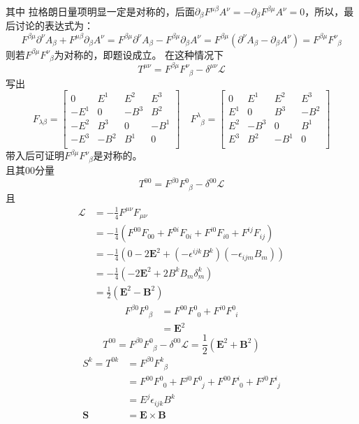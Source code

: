 \documentclass{article}
\begin{document}
其中 拉格朗日量项明显一定是对称的，后面$\partial_{\beta} F^{\mu \beta} A^{\nu} = - \partial_{\beta} F^{\beta \mu} A^{\nu} = 0$，所以，最后讨论的表达式为：
$$
F^{\beta \mu} \partial^{\nu} A_{\beta} + F^{\mu \beta} \partial_{\beta}A^{\nu} = F^{\beta \mu} \partial^{\nu} A_{\beta} - F^{\beta \mu} \partial_{\beta}A^{\nu} =  F^{\beta \mu}(\partial^{\nu} A_{\beta} -\partial_{\beta}A^{\nu} ) 
= F^{\beta \mu} F^{\nu}_{\phantom{\nu} \beta}
$$
则若$F^{\beta \mu} F^{\nu}_{\phantom{\nu} \beta}$为对称的，即题设成立。
在这种情况下$$T^{\mu \nu} = F^{\beta \mu} F^{\nu}_{\phantom{\nu} \beta} - \delta^{\mu \nu} \mathcal{L}$$
写出$$
F_{\lambda \beta} = 
\left[ 
	\begin{matrix}
	0 & E^1 & E^2 & E^3 \\
	-E^1 & 0	& -B^3 & B^2 \\
	-E^2 & B^3 & 0 & -B^1 \\
	-E^3 & -B^2 & B^1 & 0 \\	
	\end{matrix}
\right]
\quad
F^{\lambda}_{\phantom{\lambda} \beta} = 
\left[ 
	\begin{matrix}
	0 & E^1 & E^2 & E^3 \\
	E^1 & 0	& B^3 & -B^2 \\
	E^2 & -B^3 & 0 & B^1 \\
	E^3 & B^2 & -B^1 & 0 \\	
	\end{matrix}
\right]
$$
带入后可证明$F^{\beta \mu} F^{\nu}_{\phantom{\nu} \beta}$是对称的。\\
且其00分量$$T^{00} =  F^{\beta 0} F^{0}_{\phantom{0} \beta} - \delta^{0 0} \mathcal{L}$$
且
\begin{align}
\mathcal{L} &= - \frac{1}{4} F^{\mu \nu} F_{\mu \nu} \nonumber \\
			&= - \frac{1}{4} (F^{ 0 0} F_{0 0 } + F^{0 i} F_{0 i}+ F^{i 0} F_{i 0}+ F^{i j} F_{i j}) \nonumber \\
			&= - \frac{1}{4} (0- 2\mathbf{E}^2 +(- \epsilon^{ijk} B^{k} )(- \epsilon_{ijm} B_{m})) \nonumber \\
			&= - \frac{1}{4} (-2\mathbf{E}^2 + 2B^{k}B_{m} \delta^{k}_{m}) \nonumber \\
			&=  \frac{1}{2} (\mathbf{E}^2 -\mathbf{B}^2) \nonumber
\end{align}
\begin{align}
 F^{\beta 0} F^{0}_{\phantom{0} \beta}
		&= F^{0 0} F^{0}_{\phantom{0} 0} +F^{i 0} F^{0}_{\phantom{0} i} \nonumber \\
		&= \mathbf{E}^2 \nonumber
\end{align}
$$T^{00} =  F^{\beta 0} F^{0}_{\phantom{0} \beta} - \delta^{0 0} \mathcal{L}= \frac{1}{2} (\mathbf{E}^2 +\mathbf{B}^2)$$
\begin{align}
S^{k} = T^{0 k} &=  F^{\beta 0} F^{k}_{\phantom{k} \beta} \nonumber \\
	&=  F^{0 0} F^{0}_{\phantom{0} 0} +  F^{j 0} F^{0}_{\phantom{0} j} + F^{0 0} F^{i}_{\phantom{i} 0} +  F^{j 0} F^{i}_{\phantom{i} j} \nonumber \\
	&= E^{j} \epsilon_{ijk}B^{k} \nonumber \\
\mathbf{S} &= \mathbf{E} \times \mathbf{B} \nonumber
\end{align}
\end{document}
